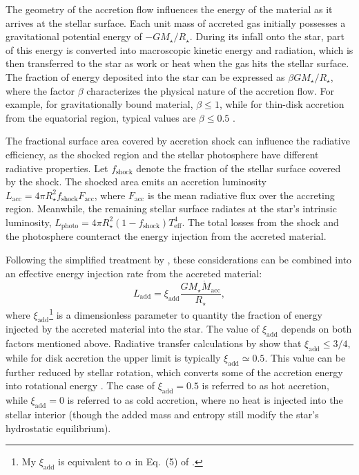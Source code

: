 \documentclass[12pt,a4paper]{article}
\newcommand{\mr}{\mathrm}
\begin{document}
The geometry of the accretion flow influences the energy of the material as it arrives at the stellar surface. Each unit mass of accreted gas initially possesses a gravitational potential energy of $-GM_\star/R_\star$. During its infall onto the star, part of this energy is converted into macroscopic kinetic energy and radiation, which is then transferred to the star as work or heat when the gas hits the stellar surface. The fraction of energy deposited into the star can be expressed as $\beta GM_\star / R_\star$, where the factor $\beta$ characterizes the physical nature of the accretion flow. For example, for gravitationally bound material, $\beta \leq 1$, while for thin-disk accretion from the equatorial region, typical values are $\beta \leq 0.5$ \parencite{PrialnikLivio1985,HartmannEtAl1998}.

The fractional surface area covered by accretion shock can influence the radiative efficiency, as the shocked region and the stellar photosphere have different radiative properties. Let $f_\mr{shock}$ denote the fraction of the stellar surface covered by the shock. The shocked area emits an accretion luminosity $L_\mr{acc} = 4\pi R_\star^2 f_\mr{shock} F_\mr{acc}$, where $F_\mr{acc}$ is the mean radiative flux over the accreting region. Meanwhile, the remaining stellar surface radiates at the star's intrinsic luminosity, $L_\mr{photo} = 4 \pi R_\star^2 (1 - f_\mr{shock}) T_\mr{eff}^4$. The total losses from the shock and the photosphere counteract the energy injection from the accreted material.

Following the simplified treatment by \textcite{HartmannEtAl1998}, these considerations can be combined into an effective energy injection rate from the accreted material:
\begin{equation}
  L_\mr{add} = \xi_\mr{add}\frac{GM_\star \dot{M}_\mr{acc}}{R_\star},
\end{equation}
where $\xi_\mr{add}$\footnote{My $\xi_\mr{add}$ is equivalent to $\alpha$ in Eq.~(5) of \textcite{HartmannEtAl1998}.} is a dimensionless parameter to quantity the fraction of energy injected by the accreted material into the star. The value of $\xi_\mr{add}$ depends on both factors mentioned above. Radiative transfer calculations by \textcite{StahlerEtAl1980} show that $\xi_\mr{add} \leq 3/4$, while for disk accretion the upper limit is typically $\xi_\mr{add} \simeq 0.5$. This value can be further reduced by stellar rotation, which converts some of the accretion energy into rotational energy \parencite{KunitomoEtAl2017}. The case of $\xi_\mr{add} = 0.5$ is referred to as hot accretion, while $\xi_\mr{add} = 0$ is referred to as cold accretion, where no heat is injected into the stellar interior (though the added mass and entropy still modify the star's hydrostatic equilibrium).
\end{document}
